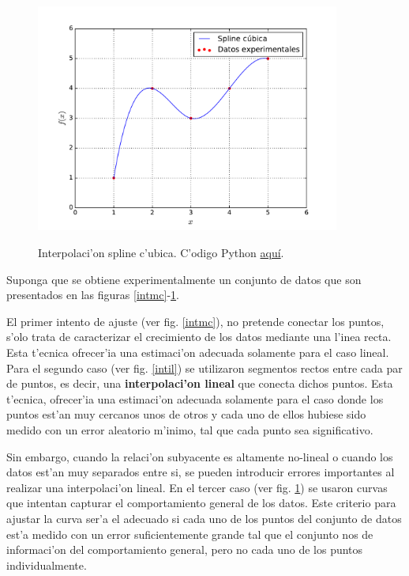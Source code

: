 \documentclass[a4paper]{report}
\begin{document}
\begin{figure}[h!]
\begin{center}
\includegraphics[width=10cm]{figs/fig-int-curv.pdf}\label{intic}
\caption{Interpolaci'on spline c'ubica. C'odigo Python  \href{https://github.com/gfrubi/Lab/blob/master/python/fig-int-curv.py}{aqu\'i}.}
\end{center}
\end{figure}

Suponga que se obtiene experimentalmente un conjunto de datos que son presentados en las figuras \ref{intmc}-\ref{intic}.

El primer intento de ajuste (ver fig. \ref{intmc}), no pretende conectar los puntos, s'olo trata de caracterizar el crecimiento de los datos mediante una l'inea recta. Esta t'ecnica ofrecer'ia una estimaci'on adecuada solamente para el caso lineal. Para el segundo caso (ver fig. \ref{intil}) se utilizaron segmentos rectos entre cada par de puntos, es decir, una \textbf{interpolaci'on lineal} que conecta dichos puntos.  Esta t'ecnica, ofrecer'ia una estimaci'on adecuada solamente para el caso donde los puntos est'an muy cercanos unos de otros y cada uno de ellos hubiese sido medido con un error aleatorio m'inimo, tal que cada punto sea significativo.

Sin embargo, cuando la relaci'on subyacente es altamente no-lineal o cuando los datos est'an muy separados entre si, se pueden introducir errores importantes al realizar una interpolaci'on lineal. En el tercer caso (ver fig. \ref{intic}) se usaron curvas que intentan capturar el comportamiento general de los datos. Este criterio para ajustar la curva ser'a el adecuado si cada uno de los puntos del conjunto de datos est'a medido con un error suficientemente grande tal que el conjunto nos de informaci'on del comportamiento general, pero no cada uno de los puntos individualmente.
\end{document}
